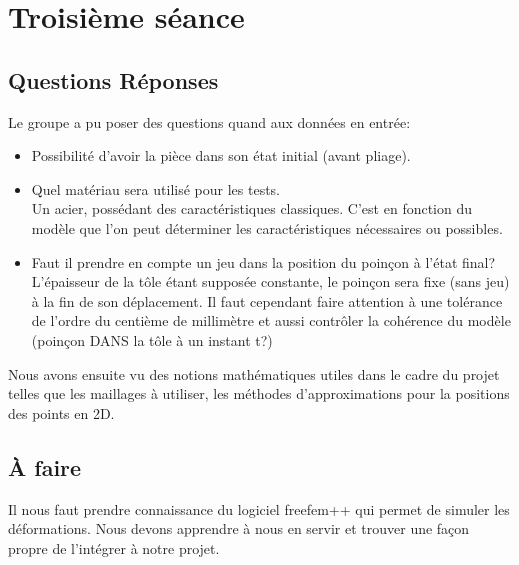 \section{Troisième séance}

\subsection{Questions Réponses}

Le groupe a pu poser des questions quand aux données en entrée:
\begin{itemize}
    \item Possibilité d'avoir la pièce dans son état initial (avant pliage).\\

    \item Quel matériau sera utilisé pour les tests.\\
        Un acier, possédant des caractéristiques  classiques.
        C'est en fonction du modèle que l'on peut déterminer les caractéristiques nécessaires ou possibles.
    \item Faut il prendre en compte un jeu dans la position du poinçon à l'état final?\\
        L'épaisseur de la tôle étant supposée constante, le poinçon sera fixe (sans jeu) à la fin de son déplacement.
        Il faut cependant faire attention à une tolérance de l'ordre du centième de millimètre et aussi contrôler la cohérence du modèle (poinçon DANS la tôle à un instant t?)
\end{itemize}

Nous avons ensuite vu des notions mathématiques utiles dans le cadre du projet telles que les maillages à utiliser, les méthodes d'approximations pour la positions des points en 2D.

\subsection{À faire}
Il nous faut prendre connaissance du logiciel freefem++ qui permet de simuler les déformations.
Nous devons apprendre à nous en servir et trouver une façon propre de l'intégrer à notre projet.


